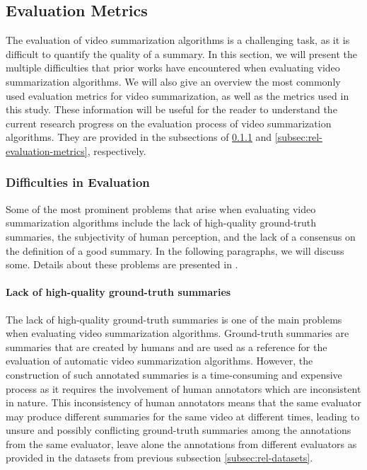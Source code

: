 
\subsection{Evaluation Metrics}
\label{subsec:rel-evaluation}

	The evaluation of video summarization algorithms is a challenging task, as it is difficult to quantify the quality of a summary. In this section, we will present the multiple difficulties that prior works have encountered when evaluating video summarization algorithms. We will also give an overview the most commonly used evaluation metrics for video summarization, as well as the metrics used in this study. These information will be useful for the reader to understand the current research progress on the evaluation process of video summarization algorithms. They are provided in the subsections of \ref{subsubsec:rel-evaluation-difficulties} and \ref{subsec:rel-evaluation-metrics}, respectively.
	
	\subsubsection{Difficulties in Evaluation}
	\label{subsubsec:rel-evaluation-difficulties}
		Some of the most prominent problems that arise when evaluating video summarization algorithms include the lack of high-quality ground-truth summaries, the subjectivity of human perception, and the lack of a consensus on the definition of a good summary. In the following paragraphs, we will discuss some. Details about these problems are presented in \cite{Apostolidis2021Video}.

			\paragraph[short]{Lack of high-quality ground-truth summaries}
				The lack of high-quality ground-truth summaries is one of the main problems when evaluating video summarization algorithms. Ground-truth summaries are summaries that are created by humans and are used as a reference for the evaluation of automatic video summarization algorithms. However, the construction of such annotated summaries is a time-consuming and expensive process as it requires the involvement of human annotators which are inconsistent in nature. This inconsistency of human annotators means that the same evaluator may produce different summaries for the same video at different times, leading to unsure and possibly conflicting ground-truth summaries among the annotations from the same evaluator, leave alone the annotations from different evaluators as provided in the datasets from previous subsection \ref{subsec:rel-datasets}.

